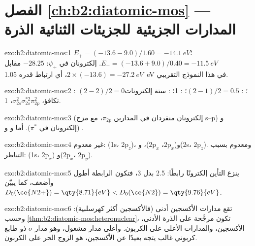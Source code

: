 \section*{الفصل \ref{ch:b2:diatomic-mos} --- المدارات الجزيئية للجزيئات الثنائية الذرة}

\begin{solution}{exo:b2:diatomic-mos:1}
$E_+ = (-13.6 - 9.0)/1.60 = \qty{-14.1}{eV}$؛ $E_- = (-13.6 + 9.0)/0.40 = \qty{-11.5}{eV}$.
إلكترونان في $\psi_+$: $-28.25$ مقابل $2 \times (-13.6) = \qty{-27.2}{eV}$، أي ارتباط قدره
\qty{1.05}{eV} في هذا النموذج التقريبي.
\end{solution}

\begin{solution}{exo:b2:diatomic-mos:2}
: $(2 - 2)/2 = 0$؛ : $(2 - 1)/2 = 0.5$؛ : 1؛ : ستة إلكترونات
تكافؤ، $\sigma_{2s}^2\sigma_{2s}^{*2}\pi_{2p}^2$،  1.
\end{solution}

\begin{solution}{exo:b2:diatomic-mos:3}
 (إلكترونان منفردان في المدارين $\pi_{2p}$، مع مزج s--p) 
و (إلكترونان في $\pi^*$). أما  و و .
\end{solution}

\begin{solution}{exo:b2:diatomic-mos:4}
غير معدوم: (1s، $2\mathrm p_z$)، و($2\mathrm p_x$، $2\mathrm p_x$)، و(2s، $2\mathrm p_z$).
ومعدوم بسبب التناظر: (1s، $2\mathrm p_x$) و($2\mathrm p_x$، $2\mathrm p_y$).
\end{solution}

\begin{solution}{exo:b2:diatomic-mos:5}
ينزع التأين إلكترونًا رابطًا:  2.5 بدل 3، فتكون الرابطة أطول
وأضعف، كما يبيّن $D_0(\ce{N2+}) = \qty{8.71}{eV} < D_0(\ce{N2}) = \qty{9.76}{eV}$.
\end{solution}

\begin{solution}{exo:b2:diatomic-mos:6}
تقع مدارات الأكسجين أدنى (فالأكسجين أكثر كهرسلبية): وحسب
\cref{thm:b2:diatomic-mos:heteronuclear}، تكون  مرجَّحة على
الذرة الأدنى، الأكسجين، والمدارات الأعلى على الكربون. وأعلى مدار
مشغول، وهو مدار $\sigma$ ذو طابع كربوني غالب يتجه بعيدًا عن الأكسجين، هو
الزوج الحر على الكربون.
\end{solution}

